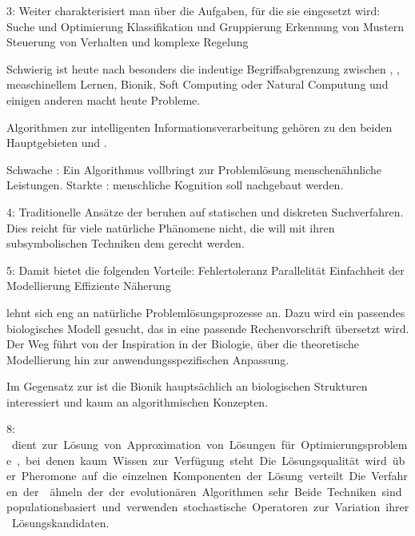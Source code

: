 3: Weiter charakterisiert man \II{} über die Aufgaben, für
die sie eingesetzt wird:
    Suche und Optimierung
    Klassifikation und Gruppierung
    Erkennung von Mustern
    Steuerung von Verhalten und komplexe Regelung

Schwierig ist heute nach
\citeauthor{bib:Kramer_2009_intelligence}
besonders die indeutige Begriffsabgrenzung
zwischen \AI{}, \CI{}, measchinellem
Lernen, Bionik, Soft Computing oder Natural Computung und
einigen anderen macht heute Probleme.

Algorithmen zur intelligenten Informationsverarbeitung
gehören zu den beiden Hauptgebieten \CI{} und \AI{}.

Schwache \AI{}: Ein Algorithmus vollbringt zur Problemlösung
menschenähnliche Leistungen.
Starkte \AI{}: menschliche Kognition soll nachgebaut werden.

4: Traditionelle Ansätze der \AI{} beruhen auf statischen
und diskreten Suchverfahren. Dies reicht für viele
natürliche Phänomene nicht, die \CI{} will mit ihren
subsymbolischen Techniken dem gerecht werden.

5: Damit bietet die \CI{} folgenden Vorteile:
    Fehlertoleranz
    Parallelität
    Einfachheit der Modellierung
    Effiziente Näherung

\CI{} lehnt sich eng an natürliche Problemlösungsprozesse
an. Dazu wird ein passendes biologisches Modell gesucht, das
in eine passende Rechenvorschrift übersetzt wird. Der Weg
führt von der Inspiration in der Biologie, über die
theoretische Modellierung hin zur anwendungsspezifischen
Anpassung.

Im Gegensatz zur \CI{} ist die Bionik hauptsächlich an
biologischen Strukturen interessiert und kaum an
algorithmischen Konzepten.

8: \SI{} dient zur Lösung von Approximation von Lösungen für
Optimierungsprobleme, bei denen kaum Wissen zur Verfügung
steht. Die Lösungsqualität wird über Pheromone auf die
einzelnen Komponenten der Lösung verteilt.

Die Verfahren der \SI{} ähneln der der evolutionären
Algorithmen sehr. Beide Techniken sind populationsbasiert
und verwenden stochastische Operatoren zur Variation ihrer
Lösungskandidaten.
